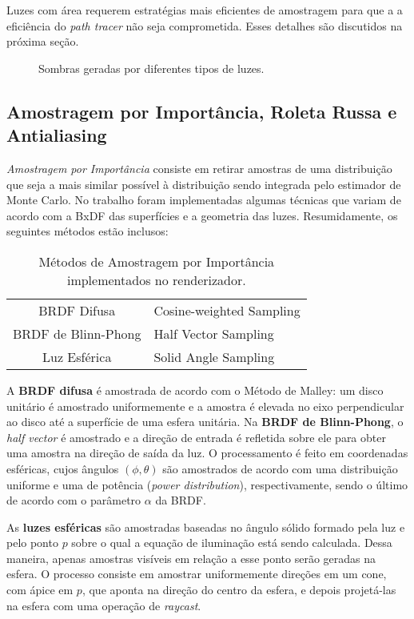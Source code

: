 \documentclass[11pt,a4paper]{article}
\begin{document}
Luzes com área requerem estratégias mais eficientes de amostragem para que a a eficiência do \textit{path tracer} não seja comprometida. Esses detalhes são discutidos na próxima seção.

\begin{figure}[!htpb]
  \centering
  \caption{Sombras geradas por diferentes tipos de luzes.}
  \label{fig:shadows}
\end{figure}

\subsection{Amostragem por Importância, Roleta Russa e Antialiasing}
\textit{Amostragem por Importância} consiste em retirar amostras de uma distribuição que seja a mais similar possível à distribuição sendo integrada pelo estimador de Monte Carlo. No  trabalho foram implementadas algumas técnicas que variam de acordo com a BxDF das superfícies e a geometria das luzes. Resumidamente, os seguintes métodos estão inclusos:
\begin{table}[!htpb]
  \centering
  \begin{tabular}{c|l} \hline
    BRDF Difusa & Cosine-weighted Sampling\\ 
    BRDF de Blinn-Phong & Half Vector Sampling\\
    Luz Esférica & Solid Angle Sampling\\ \hline
  \end{tabular}
  \caption{Métodos de Amostragem por Importância implementados no renderizador.}
  \label{tab:importance}
\end{table}

A \textbf{BRDF difusa} é amostrada de acordo com o Método de Malley: um disco unitário é amostrado uniformemente e a amostra é elevada no eixo perpendicular ao disco até a superfície de uma esfera unitária. Na\textbf{ BRDF de Blinn-Phong}, o \textit{half vector} é amostrado e a direção de entrada é refletida sobre ele para obter uma amostra na direção de saída da luz. O processamento é feito em coordenadas esféricas, cujos ângulos $(\phi, \theta)$ são amostrados de acordo com uma distribuição uniforme e uma de potência (\textit{power distribution}), respectivamente, sendo o último de acordo com o parâmetro $\alpha$ da BRDF.

As \textbf{luzes esféricas} são amostradas baseadas no ângulo sólido formado pela luz e pelo ponto $p$ sobre o qual a equação de iluminação está sendo calculada. Dessa maneira, apenas amostras visíveis em relação a esse ponto serão geradas na esfera. O processo consiste em amostrar uniformemente direções em um cone, com ápice em $p$, que aponta na direção do centro da esfera, e depois projetá-las na esfera com uma operação de \textit{raycast}.
\end{document}
